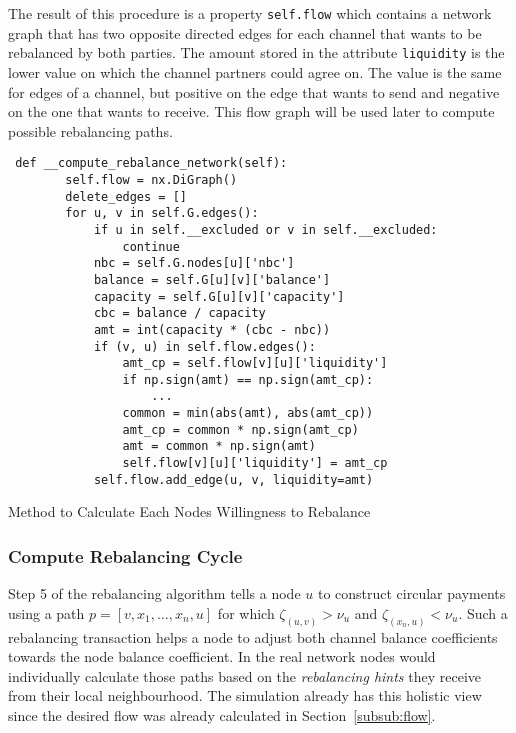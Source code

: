 \documentclass[final]{fhnwreport}       %
\begin{document}
The result of this procedure is a property \texttt{self.flow} which contains a network graph that has two opposite directed edges for each channel that wants to be rebalanced by both parties. The amount stored in the attribute \texttt{liquidity} is the lower value on which the channel partners could agree on. The value is the same for edges of a channel, but positive on the edge that wants to send and negative on the one that wants to receive. This flow graph will be used later to compute possible rebalancing paths. 

\begin{listing}[H]
  \begin{verbatim}
 def __compute_rebalance_network(self):
        self.flow = nx.DiGraph()
        delete_edges = []
        for u, v in self.G.edges():
            if u in self.__excluded or v in self.__excluded:
                continue
            nbc = self.G.nodes[u]['nbc']
            balance = self.G[u][v]['balance']
            capacity = self.G[u][v]['capacity']
            cbc = balance / capacity
            amt = int(capacity * (cbc - nbc))
            if (v, u) in self.flow.edges():
                amt_cp = self.flow[v][u]['liquidity']
                if np.sign(amt) == np.sign(amt_cp):
                    ...
                common = min(abs(amt), abs(amt_cp))
                amt_cp = common * np.sign(amt_cp)
                amt = common * np.sign(amt)
                self.flow[v][u]['liquidity'] = amt_cp
            self.flow.add_edge(u, v, liquidity=amt)
  \end{verbatim}
  \caption{Method to Calculate Each Nodes Willingness to Rebalance}
  \label{code:comp_flow}
\end{listing}

\subsubsection{Compute Rebalancing Cycle}
Step 5 of the rebalancing algorithm tells a node $u$ to construct circular payments using a path $p = [v,x_1,\dots,x_n,u]$ for which $\zeta_{(u,v)}>\nu_u$ and $\zeta_{(x_n,u)}<\nu_u$. Such a rebalancing transaction helps a node to adjust both channel balance coefficients towards the node balance coefficient. In the real network nodes would individually calculate those paths based on the \emph{rebalancing hints} they receive from their local neighbourhood. The simulation already has this holistic view since the desired flow was already calculated in Section~\ref{subsub:flow}. 
\end{document}
